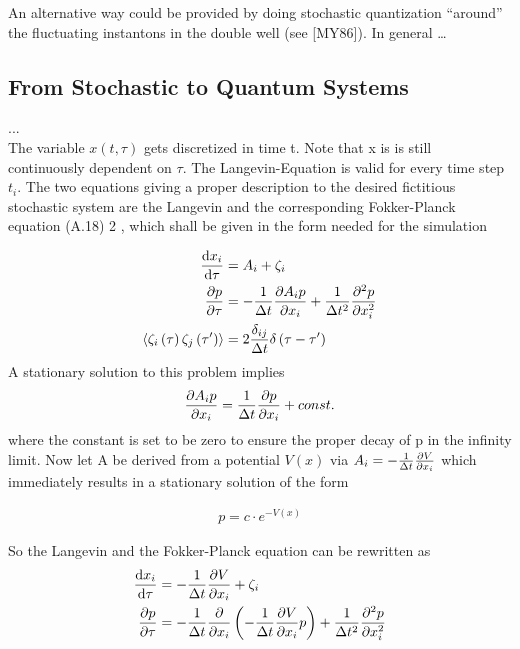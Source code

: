 An alternative way could be provided by doing stochastic quantization
\enquote{around} the fluctuating instantons in the double well (see [MY86]). In general \dots


\vspace{5\baselineskip}



\newpage

\subsection{From Stochastic to Quantum Systems}
...\\
\noindent The variable $x(t,\tau)$ gets discretized in time t. Note that x is is still continuously dependent on $\tau$. The Langevin-Equation is valid for every time step $t_i$. The two equations giving a proper description to the desired fictitious stochastic system
are the Langevin and the corresponding Fokker-Planck equation (A.18) 2 , which shall be
given in the form needed for the simulation

\begin{align}
    \dv{x_i}{\tau} &= A_i + \zeta_i\\
    \pdv{p}{\tau} &= - \frac{1}{\Delta t} \pdv{A_i p}{x_i} + \frac{1}{\Delta t^2} \pdv[2]{p}{x_i}\\
    \langle \zeta_i \left(\tau \right) \zeta_j \left( \tau' \right) \rangle &= 2 \frac{\delta_{ij}}{\Delta t} \delta\left( \tau - \tau' \right)
\end{align}
\noindent A stationary solution to this problem implies
\begin{align}
    \pdv{A_i p}{x_i} = \frac{1}{\Delta t} \pdv{p}{x_i} + const.
\end{align}
where the constant is set to be zero to ensure the proper decay of p in the infinity  limit. Now let A be derived from a potential $V(x)$ via $A_i = - \frac{1}{\Delta t} \pdv{V}{x_i}$ which immediately results in a stationary solution of the form

\begin{align}
    p = c \cdot e^{-V(x)}
\end{align}{}

\noindent So the Langevin and the Fokker-Planck equation can be rewritten as
\begin{align}
    \dv{x_i}{\tau} &= - \frac{1}{\Delta t} \pdv{V}{x_i} + \zeta_i\\
    \pdv{p}{\tau} &= - \frac{1}{\Delta t} \pdv{x_i} \left( - \frac{1}{\Delta t} \pdv{V}{x_i} p \right) + \frac{1}{\Delta t^2} \pdv[2]{p}{x_i}
\end{align}{}

